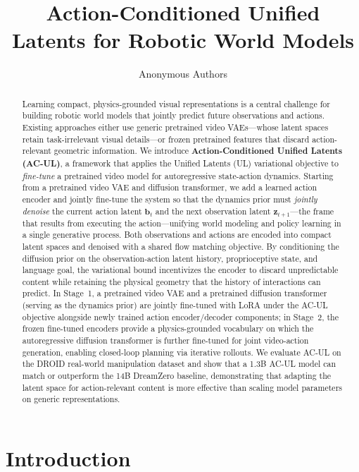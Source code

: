 \documentclass{article}
\title{Action-Conditioned Unified Latents for Robotic World Models}
\author{
  Anonymous Authors
}
\date{}
\newcommand{\vz}{\bm{z}}
\newcommand{\vb}{\bm{b}}
\begin{document}
\maketitle

\begin{abstract}
Learning compact, physics-grounded visual representations is a central challenge for building robotic world models that jointly predict future observations and actions.
Existing approaches either use generic pretrained video VAEs---whose latent spaces retain task-irrelevant visual details---or frozen pretrained features that discard action-relevant geometric information.
We introduce \textbf{Action-Conditioned Unified Latents (AC-UL)}, a framework that applies the Unified Latents (UL) variational objective to \emph{fine-tune} a pretrained video model for autoregressive state-action dynamics.
Starting from a pretrained video VAE and diffusion transformer, we add a learned action encoder and jointly fine-tune the system so that the dynamics prior must \emph{jointly denoise} the current action latent $\vb_t$ and the next observation latent $\vz_{t+1}$---the frame that results from executing the action---unifying world modeling and policy learning in a single generative process.
Both observations and actions are encoded into compact latent spaces and denoised with a shared flow matching objective.
By conditioning the diffusion prior on the observation-action latent history, proprioceptive state, and language goal, the variational bound incentivizes the encoder to discard unpredictable content while retaining the physical geometry that the history of interactions can predict.
In Stage~1, a pretrained video VAE and a pretrained diffusion transformer (serving as the dynamics prior) are jointly fine-tuned with LoRA under the AC-UL objective alongside newly trained action encoder/decoder components; in Stage~2, the frozen fine-tuned encoders provide a physics-grounded vocabulary on which the autoregressive diffusion transformer is further fine-tuned for joint video-action generation, enabling closed-loop planning via iterative rollouts.
We evaluate AC-UL on the DROID real-world manipulation dataset and show that a 1.3B AC-UL model can match or outperform the 14B DreamZero baseline, demonstrating that adapting the latent space for action-relevant content is more effective than scaling model parameters on generic representations.
\end{abstract}

\section{Introduction}
\label{sec:intro}
\end{document}
